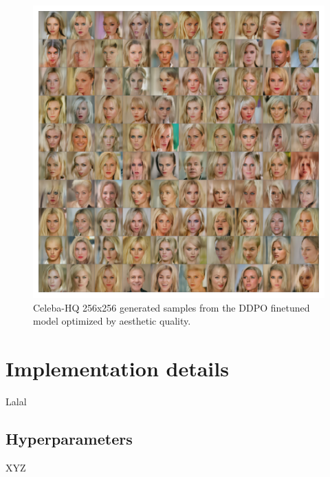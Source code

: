 \begin{appendixs}
        \begin{figure}
            \centering
            \includegraphics[scale=0.75]{img/results/ddpo-aesthetic-samples.png}
            \vspace{-4pt}  %
            \captionsetup{width=\textwidth} %
            \caption{Celeba-HQ 256x256 generated samples from the DDPO finetuned model optimized by aesthetic quality.}
            \label{fig:ddpo-aesthetic-samples}
        \end{figure}

    \newpage

    \section{Implementation details}

    Lalal

    \subsection{Hyperparameters}

    XYZ


\end{appendixs}
